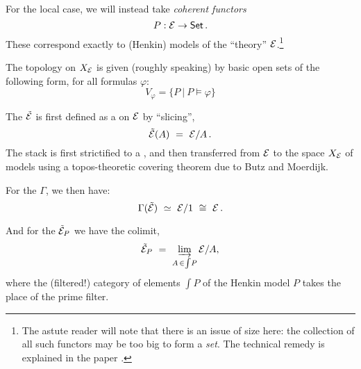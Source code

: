 \documentclass[lambek.tex]{subfiles}
\begin{document}
For the local case, we will instead take \emph{coherent functors} $$P: \mathcal{E}\to\mathsf{Set}\,.$$
These correspond exactly to (Henkin) models of the ``theory'' $\mathcal{E}$.\footnote{
The astute reader will note that there is an issue of size here: the collection of all such functors may be too big to form a \emph{set}.  The technical remedy is explained in the paper \cite{Awodey1998}.}

The topology on $X_{\mathcal{E}}$ is given (roughly speaking) by basic open sets of the following form, for all formulas $\varphi$:
\[
V_\varphi = \{ P\ |\ P\models \varphi \}
\]


The  $\tilde{\mathcal{E}}$ is first defined as a  on $\mathcal{E}$ by ``slicing'',
\[
\tilde{\mathcal{E}}(A)\ =\ \mathcal{E}/A\,.
\] 
The stack is first strictified to a , and then transferred from $\mathcal{E}$ to the space $X_{\mathcal{E}}$ of models using a topos-theoretic covering theorem due to Butz and Moerdijk.
\medskip

For the  $\Gamma$, we then have:
$$\Gamma(\tilde{\E})\ \simeq\ \E/1\ \cong\ \E\,.$$

And for the  $\tilde{\mathcal{E}}_P$ we have the colimit,
\[
\tilde{\E}_P\ =\ \varinjlim_{A\,\in\int\!{P}} \E/A, 
\]
where the (filtered!) category of elements $\int\!{P}$ of the Henkin model $P$ takes the place of the prime filter.  
\end{document}
